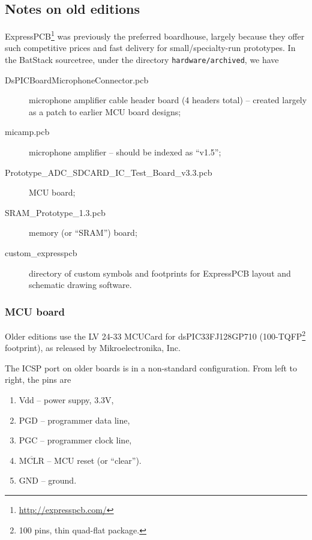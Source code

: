 \documentclass[letterpaper]{article}
\begin{document}
\subsection{Notes on old editions}

ExpressPCB\footnote{\url{http://expresspcb.com/}} was previously the
preferred boardhouse, largely because they offer such competitive
prices and fast delivery for small/specialty-run prototypes. In the
BatStack sourcetree, under the directory \texttt{hardware/archived},
we have
\begin{description}
\item[DsPICBoardMicrophoneConnector.pcb] microphone amplifier cable header
  board (4 headers total) -- created largely as a patch to earlier MCU
  board designs;
\item[micamp.pcb] microphone amplifier -- should be indexed as ``v1.5'';
\item[Prototype\_ADC\_SDCARD\_IC\_Test\_Board\_v3.3.pcb] MCU board;
\item[SRAM\_Prototype\_1.3.pcb] memory (or ``SRAM'') board;
\item[custom\_expresspcb] directory of custom symbols and footprints
  for ExpressPCB layout and schematic drawing software.
\end{description}

\subsubsection{MCU board}
\label{oldmcu:sec}

Older editions use the LV 24-33 MCUCard for dsPIC33FJ128GP710
(100-TQFP\footnote{100 pins, thin quad-flat package.} footprint), as
released by Mikroelectronika, Inc.

The ICSP port on older boards is in a non-standard configuration. From
left to right, the pins are
\begin{enumerate}
\item Vdd -- power suppy, 3.3V,

\item PGD -- programmer data line,

\item PGC -- programmer clock line,

\item $\overline{\textrm{MCLR}}$ -- MCU reset (or ``clear'').

\item GND -- ground.
\end{enumerate}
\end{document}
